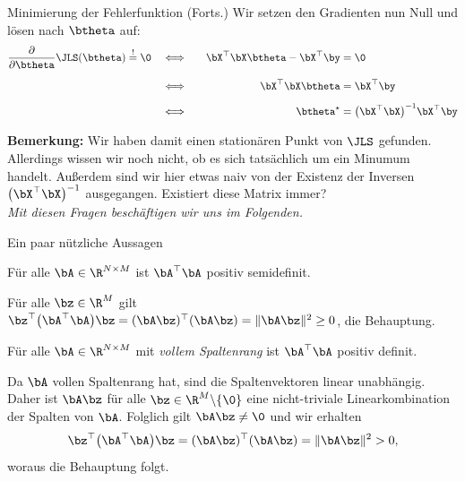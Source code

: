 \begin{frame}{Minimierung der Fehlerfunktion (Forts.)}{}
	Wir setzen den Gradienten nun Null und lösen nach $\btheta$ auf:
	\begin{alignat*}{3}
		\frac{\partial}{\partial \btheta} \JLS(\btheta) \overset{!}{=} \0
			&\quad\Longleftrightarrow\quad
			&\bX^\top \bX \btheta - \bX^\top \by
			&= \0
	\\[2mm]
			&\quad\Longleftrightarrow\quad
			&\bX^\top \bX \btheta
			&= \bX^\top \by
	\\[2mm]
			&\quad\Longleftrightarrow\quad
			&\btheta^\star
			&= \bigl( \bX^\top \bX \bigr)^{-1} \bX^\top \by
	\end{alignat*}

	\begin{boxGray}
		\textbf{Bemerkung:} Wir haben damit einen stationären Punkt von $\JLS$ gefunden. Allerdings wissen wir noch nicht,
		ob es sich tatsächlich um ein Minumum handelt. Außerdem sind wir hier etwas naiv von der Existenz der Inversen
		$\bigl( \bX^\top \bX \bigr)^{-1}$ ausgegangen. Existiert diese Matrix immer? \\
		\textit{Mit diesen Fragen beschäftigen wir uns im Folgenden.}
	\end{boxGray}
\end{frame}


\begin{frame}{Ein paar nützliche Aussagen}{}
	\begin{mytheo}
		Für alle $\bA \in \R^{N \times M}$ ist $\bA^\top \bA$ positiv semidefinit.
	\end{mytheo}
	
	\begin{myproof}
		Für alle $\bz \in \R^M$ gilt
		$\bz^\top \bigl( \bA^\top \bA \bigr) \bz = (\bA \bz)^\top (\bA \bz) = \Vert \bA \bz \Vert^2 \ge 0$,
		die Behauptung.	
	\end{myproof}

	\begin{mytheo}
		Für alle $\bA \in \R^{N \times M}$ mit \textit{vollem Spaltenrang} ist $\bA^\top \bA$ positiv definit.
	\end{mytheo}

	\begin{myproof}
		Da $\bA$ vollen Spaltenrang hat, sind die Spaltenvektoren linear unabhängig.
		Daher ist $\bA \bz$ für alle $\bz \in \R^M \backslash \{ \0 \}$ eine nicht-triviale Linearkombination
		der Spalten von $\bA$. Folglich gilt $\bA \bz \ne \0$ und wir erhalten
		$$\bz^\top \bigl( \bA^\top \bA \bigr) \bz = (\bA \bz)^\top (\bA \bz) = \Vert \bA \bz \Vert^2 > 0,$$ woraus die Behauptung folgt.
	\end{myproof}
\end{frame}



